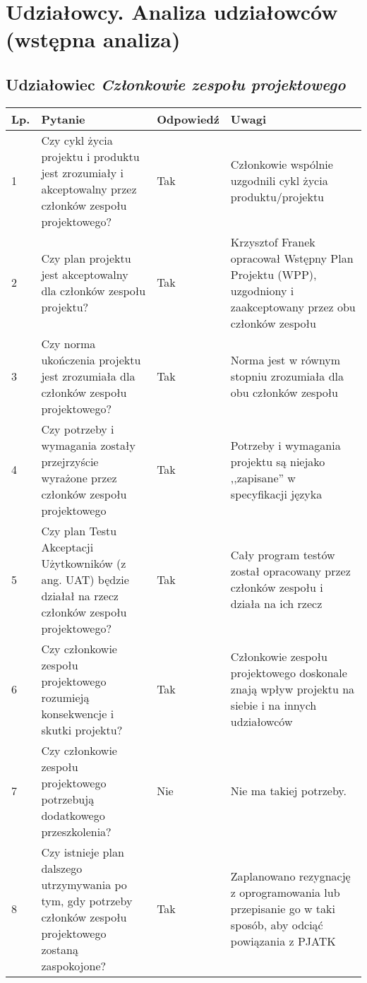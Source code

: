 \documentclass[11pt,oneside,a4paper,titlepage,onecolumn]{article}
\begin{document}
\section{Udziałowcy. Analiza udziałowców (wstępna analiza)}

\subsection{Udziałowiec \textit{Członkowie zespołu projektowego}}

\begin{tabularx}{\textwidth}{|l|X|l|X|}
	\hline
	
	\hline
    Lp. & Pytanie & Odpowiedź & Uwagi \\ \hline
    
    1
    & Czy cykl życia projektu i produktu jest zrozumiały i
    akceptowalny przez członków zespołu projektowego?
    & Tak
    & Członkowie wspólnie uzgodnili cykl życia produktu/projektu
    \\\hline
    
    2
    & Czy plan projektu jest akceptowalny dla członków zespołu
    projektu?
    & Tak
    & Krzysztof Franek opracował Wstępny Plan Projektu (WPP), 
    uzgodniony i zaakceptowany przez obu członków zespołu
    \\\hline
    
    3
    & Czy norma ukończenia projektu jest zrozumiała dla członków
    zespołu projektowego?
    & Tak
    & Norma jest w równym stopniu zrozumiała dla obu członków zespołu
    \\\hline
    
    4
    & Czy potrzeby i wymagania zostały przejrzyście wyrażone
    przez członków zespołu projektowego
    & Tak
    & Potrzeby i wymagania projektu są niejako ,,zapisane'' w
    specyfikacji języka
    \\\hline
    
    5
    & Czy plan Testu Akceptacji Użytkowników (z ang. UAT) będzie
    działał na rzecz członków zespołu projektowego?
    & Tak
    & Cały program testów został opracowany przez członków zespołu
    i działa na ich rzecz
    \\\hline
    
    6
    & Czy członkowie zespołu projektowego rozumieją konsekwencje i
    skutki projektu?
    & Tak
    & Członkowie zespołu projektowego doskonale znają wpływ projektu
    na siebie i na innych udziałowców
    \\\hline
    
    7
    & Czy członkowie zespołu projektowego potrzebują dodatkowego
    przeszkolenia?
    & Nie
    & Nie ma takiej potrzeby.
    \\\hline
    
    8
    & Czy istnieje plan dalszego utrzymywania po tym, gdy
    potrzeby członków zespołu projektowego zostaną zaspokojone?
    & Tak
    & Zaplanowano rezygnację z oprogramowania lub przepisanie go 
    w taki sposób, aby odciąć powiązania z PJATK
    \\\hline
\end{tabularx}
\end{document}
